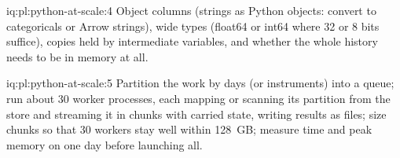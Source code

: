\begin{solution}{iq:pl:python-at-scale:4}
Object columns (strings as Python objects: convert to categoricals or Arrow strings), wide types (float64 or int64 where 32 or 8 bits
suffice), copies held by intermediate variables, and whether the whole history needs to be in memory at all.
\end{solution}

\begin{solution}{iq:pl:python-at-scale:5}
Partition the work by days (or instruments) into a queue; run about 30 worker processes, each mapping or scanning its partition from
the store and streaming it in chunks with carried state, writing results as files; size chunks so that 30 workers stay well within
128~GB; measure time and peak memory on one day before launching all.
\end{solution}
